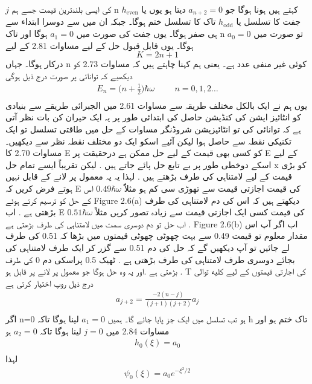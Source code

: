 \documentclass{book}
\begin{document}
\(j\)
کی ایسی بلندترین قیمت جسے ہم
n
کہتے ہیں ہونا ہوگا جو
\(a_{n+2}=0\)
دیتا ہو یوں یا
\(h_{\text{even}}\)
جفت کا تسلسل یا
\(h_{\text{odd}}\)
تاک کا تسلسل ختم ہوگا۔ جبکہ ان میں سے دوسرا ابتداء سے ہی صفر ہوگا۔ یوں جفت کی صورت میں
\(a_{1}=0\)
ہوگا اور تاک n تو صورت میں
\(a_{0}=0\)
ہوگا۔ یوں قابل قبول حل کے لیے مساوات 2.81 کے لیے
\[K=2n+1\]
درکار ہوگا۔ جہاں n کوئی غیر منفی عدد ہے۔ یعنی ہم کہنا چاہتے ہیں کہ مساوات 2.73 کو دیکھیے کہ توانائی پر صورت درج ذیل ہوگی
\begin{align*}
E_{n}=\big(n+\frac{1}{2}\big )\hbar\omega\hspace{1cm} n=0,1,2\dotsc\\
\end{align*}
یوں ہم نے ایک بالکل مختلف طریقہ سے مساوات 2.61 میں الجبرائی طریقے سے بنیادی کو انٹائیز ایشن کی کنڈیشن حاصل کی ابتدائی طور پر یہ ایک حیران کن بات نظر آتی ہے کہ توانائی کی تو انٹائیزیشن شروڈنگر مساوات کے حل میں طاقتی تسلسل تو ایک تکنیکی نقطہ سے حاصل ہوا لیکن آئیے اسکو ایک دو مختلف نقطہ نظر سے دیکھیں۔ مساوات 2.70 کا E
کو کسی بھی قیمت کے لیے حل ممکن ہے درحقیقت پر
E
کے لیے اسکے دوخطی طور پر بے تابع حل پائے جاتے ہیں . لیکن تقریباً ایسے تمام حل
x
کو بڑی قیمت کے لیے لامتناہی کی طرف بڑھتے ہیں . لہذا یہ یہ معمول پر لانے کے قابل نہیں ہوتے فرض کریں کہ
E
کی قیمت اجازتی قیمت سے تھوڑی سی کم ہو مثلاًً
\(0.49\hbar\omega\)
اس کے حل کو ترسیم کرتے ہوئے
Figure 2.6(a)
دیکھتے ہیں کہ اس کی دم لامتناہی کی طرف بڑھتی ہے . اب E کی قیمت کسی ایک اجازتی قیمت سے زیادہ تصور کریں مثلاً
\(0.51\hbar\omega\)
اب حل تو دم دوسری سمت میں لامتناہی کی طرف بڑھتی ہے .
Figure 2.6(b)
اب اگر  آپ اس مقدار معلوم تو قیمت
0.49
سے بہت چھوٹی چھوٹی قیمتوں میں بڑھا کہ
0.51
کی طرف لے جائیں تو آپ دیکھیں گے کہ حل کی دم
0.51
سے گزر کر ایک طرف لامتناہی کی بجائے دوسری طرف لامتناہی کی طرف بڑھتی ہے . ٹھیک 0.5 پراسکی دم 0 کی طرف بڑھتی ہے .اور یہ وہ حل ہوگا جو معمول پر لانے پر قابل ہو . T کی اجارتی قیمتوں کے لیے کلیه توالی درج ذیل روپ اختیار کرتی ہے
\begin{align*}
a_{j+2}=\frac{-2(n-j)}{(j+1)(j+2)}a_{j}\\
\end{align*}
اگر
n=0
ہو تب تسلسل میں ایک جز پایا جائے گا۔ ہمیں
\(a_{1}=0\)
لینا ہوگا تاکہ
h
تاک ختم ہو اور مساوات 2.84 میں
\(j=0\)
لینا ہوگا تاکہ
\(a_{2}=0\)
ہو
\begin{align*}
h_{0}(\xi)=a_{0}\\
\end{align*}
لہذا
\begin{align*}
\psi_{0}(\xi)=a_{0}e^{-\xi^{2}/2}\\
\end{align*}
\end{document}
